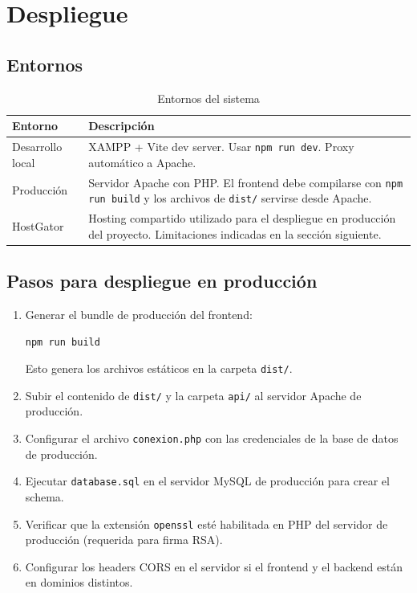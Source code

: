 \documentclass[10pt,letterpaper]{report}
\begin{document}
\chapter{Despliegue}

\section{Entornos}

\begin{table}[H]
\centering
\caption{Entornos del sistema}
\label{tab:entornos}
\begin{tabular}{p{} p{}}
\toprule
\textbf{Entorno} & \textbf{Descripción} \\
\midrule
Desarrollo local & XAMPP + Vite dev server. Usar \texttt{npm run dev}. Proxy automático a Apache. \\
Producción & Servidor Apache con PHP. El frontend debe compilarse con \texttt{npm run build} y los archivos de \texttt{dist/} servirse desde Apache. \\
HostGator & Hosting compartido utilizado para el despliegue en producción del proyecto. Limitaciones indicadas en la sección siguiente. \\
\bottomrule
\end{tabular}
\end{table}

\section{Pasos para despliegue en producción}

\begin{enumerate}[label=\arabic*.]
  \item Generar el bundle de producción del frontend:
  \begin{lstlisting}[style=bashstyle]
npm run build
  \end{lstlisting}
  Esto genera los archivos estáticos en la carpeta \texttt{dist/}.

  \item Subir el contenido de \texttt{dist/} y la carpeta \texttt{api/} al servidor Apache de producción.

  \item Configurar el archivo \texttt{conexion.php} con las credenciales de la base de datos de producción.

  \item Ejecutar \texttt{database.sql} en el servidor MySQL de producción para crear el schema.

  \item Verificar que la extensión \texttt{openssl} esté habilitada en PHP del servidor de producción (requerida para firma RSA).

  \item Configurar los headers CORS en el servidor si el frontend y el backend están en dominios distintos.
\end{enumerate}
\end{document}
